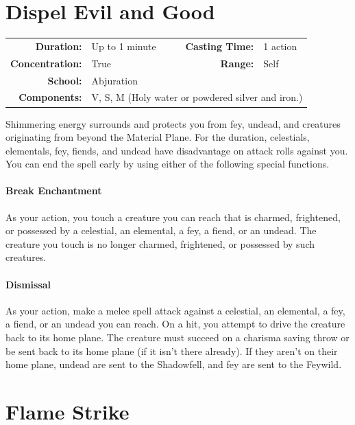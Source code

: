 \documentclass[12pt,showtrims]{memoir}
\begin{document}
\newpage
\section*{Dispel Evil and Good}

{
\small\centering\vspace{-6pt}
\begin{tabular}{rlrl}
\toprule

\textbf{Duration:} & Up to 1 minute &
\textbf{Casting Time:} & 1 action \\
\textbf{Concentration:} & True &
\textbf{Range:} & Self \\
\textbf{School:} & Abjuration \\
\textbf{Components:} & \multicolumn{3}{p{0.7\textwidth}}{V, S, M (Holy water or powdered silver and iron.)}\\

\bottomrule
\end{tabular}
}

\vspace{1\baselineskip}\noindent Shimmering energy surrounds and protects you from fey, undead, and creatures originating from beyond the Material Plane. For the duration, celestials, elementals, fey, fiends, and undead have disadvantage on attack rolls against you. You can end the spell early by using either of the following special functions. \paragraph{Break Enchantment} As your action, you touch a creature you can reach that is charmed, frightened, or possessed by a celestial, an elemental, a fey, a fiend, or an undead. The creature you touch is no longer charmed, frightened, or possessed by such creatures. \paragraph{Dismissal} As your action, make a melee spell attack against a celestial, an elemental, a fey, a fiend, or an undead you can reach. On a hit, you attempt to drive the creature back to its home plane. The creature must succeed on a charisma saving throw or be sent back to its home plane (if it isn't there already). If they aren't on their home plane, undead are sent to the Shadowfell, and fey are sent to the Feywild.

\newpage
\section*{Flame Strike}
\end{document}
